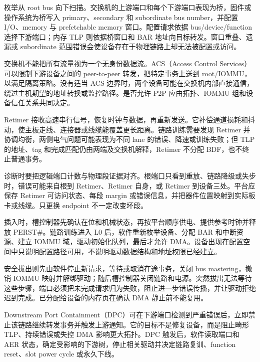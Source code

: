 
枚举从 root bus 向下扫描。交换机的上游端口和每个下游端口表现为桥，固件或操作系统为桥写入 primary、secondary 和 subordinate bus number，并配置 I/O、memory 与 prefetchable memory 窗口。配置请求依据 bus/device/function 选择下游端口；内存 TLP 则依据桥窗口和 BAR 地址向目标转发。窗口重叠、遗漏或 subordinate 范围错误会使设备存在于物理链路上却无法被配置或访问。

交换机不能把所有流量视为一个无身份数据流。ACS（Access Control Services）可以限制下游设备之间的 peer-to-peer 转发，把特定事务上送到 root/IOMMU，以满足隔离策略。没有适当 ACS 边界时，两个设备可能在交换机内部直接通信，绕过主机期望的地址转换或监控路径。是否允许 P2P 应由拓扑、IOMMU 组和设备信任关系共同决定。


Retimer 接收高速串行信号，恢复时钟与数据，再重新发送。它补偿通道损耗和抖动，使主板走线、连接器或线缆能覆盖更长距离。链路训练需要发现 Retimer 并协调均衡，两侧电气问题可能表现为不同 lane 的错误、降速或训练失败；但 TLP 的地址、tag 和完成匹配仍由两端及交换机解释，Retimer 不分配 BDF，也不终止普通事务。

诊断时要把逻辑端口计数与物理段证据对齐。根端口只看到重放、链路降级或失步时，错误可能来自根到 Retimer、Retimer 自身，或 Retimer 到设备三处。平台应保存 Retimer 可访问状态、每段 margin 或错误信息，并把器件位置映射到实际板卡或线缆。只更换 endpoint 不一定改变坏段。


插入时，槽控制器先确认在位和机械状态，再按平台顺序供电、提供参考时钟并释放 PERST\#。链路训练进入 L0 后，软件重新枚举设备、分配 BAR 和中断资源、建立 IOMMU 域，驱动初始化队列，最后才允许 DMA。设备出现在配置空间中只说明配置路径可用，不说明驱动数据结构和地址权限已经建立。

安全拔出则先由软件停止新请求，等待或取消在途事务，关闭 bus mastering，撤销 IOMMU 映射并解绑驱动；随后槽控制器关闭链路和电源。突然拔出无法等待这些步骤，端口必须把未完成请求归为失败，阻止进一步错误传播，并让驱动拒绝迟到完成。已分配给设备的内存页在确认 DMA 静止前不能复用。


Downstream Port Containment（DPC）可在下游端口检测到严重错误后，立即禁止该链路继续转发事务并触发上游通知。它的目标不是修复设备，而是阻止畸形 TLP、持续错误或失控 DMA 影响更大拓扑。DPC 触发后，软件读取端口和 AER 状态，确定受影响的下游树，停止相关驱动并决定链路复训、function reset、slot power cycle 或永久下线。

